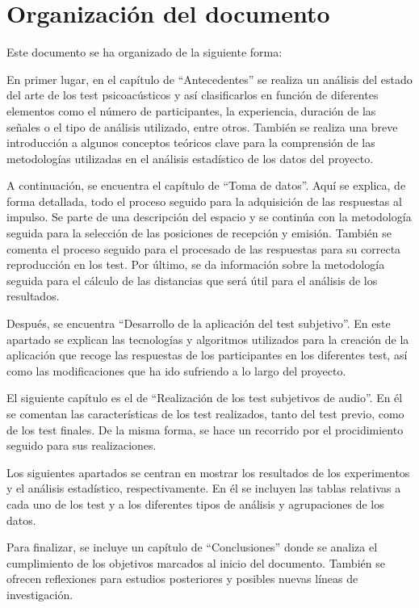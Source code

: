 \documentclass[11pt,a4paper]{book}
\begin{document}
    \section{Organización del documento}
        Este documento se ha organizado de la siguiente forma:
        
        En primer lugar, en el capítulo de ``Antecedentes'' se realiza un análisis del estado del arte de los test psicoacústicos y así clasificarlos en función de diferentes elementos como el número de participantes, la experiencia, duración de las señales o el tipo de análisis utilizado, entre otros. También se realiza una breve introducción a algunos conceptos teóricos clave para la comprensión de las metodologías utilizadas en el análisis estadístico de los datos del proyecto.
        
        A continuación, se encuentra el capítulo de ``Toma de datos''. Aquí se explica, de forma detallada, todo el proceso seguido para la adquisición de las respuestas al impulso. Se parte de una descripción del espacio y se continúa con la metodología seguida para la selección de las posiciones de recepción y emisión. También se comenta el proceso seguido para el procesado de las respuestas para su correcta reproducción en los test. Por último, se da información sobre la metodología seguida para el cálculo de las distancias que será útil para el análisis de los resultados.
        
        Después, se encuentra ``Desarrollo de la aplicación del test subjetivo''. En este apartado se explican las tecnologías y algoritmos utilizados para la creación de la aplicación que recoge las respuestas de los participantes en los diferentes test, así como las modificaciones que ha ido sufriendo a lo largo del proyecto.
        
        El siguiente capítulo es el de ``Realización de los test subjetivos de audio''. En él se comentan las características de los test realizados, tanto del test previo, como de los test finales. De la misma forma, se hace un recorrido por el procidimiento seguido para sus realizaciones.
        
        Los siguientes apartados se centran en mostrar los resultados de los experimentos y el análisis estadístico, respectivamente. En él se incluyen las tablas relativas a cada uno de los test y a los diferentes tipos de análisis y agrupaciones de los datos.
        
        Para finalizar, se incluye un capítulo de ``Conclusiones'' donde se analiza el cumplimiento de los objetivos marcados al inicio del documento. También se ofrecen reflexiones para estudios posteriores y posibles nuevas líneas de investigación.
        
\end{document}

